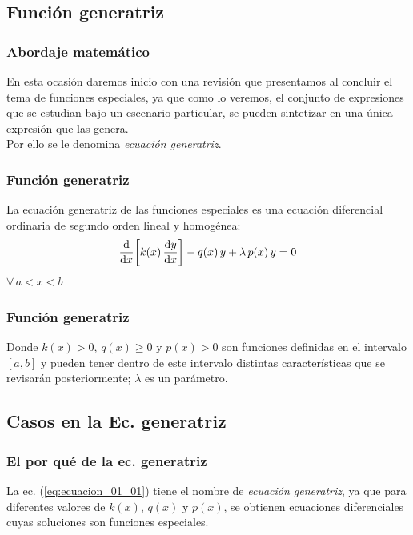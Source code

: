 \documentclass[12pt]{beamer}
\begin{document}
\subsection{Función generatriz}

\begin{frame}
\frametitle{Abordaje matemático}
En esta ocasión daremos inicio con una revisión que presentamos al concluir el tema de funciones especiales, ya que como lo veremos, el conjunto de expresiones que se estudian bajo un escenario particular, se pueden sintetizar en una única expresión que las genera.
\\
\bigskip
\pause
Por ello se le denomina \emph{ecuación generatriz}.
\end{frame}
\begin{frame}
\frametitle{Función generatriz}
La ecuación generatriz de las funciones especiales es una ecuación diferencial ordinaria de segundo orden lineal y homogénea:
\pause
\begin{align}
\dv{x} \bigg[ k(x) \, \dv{y}{x} \bigg] -  q(x) \, y + \lambda \, p(x) \, y = 0
\label{eq:ecuacion_01_01}
\end{align}
$\forall \, a < x < b$
\end{frame}
\begin{frame}
\frametitle{Función generatriz}
Donde $k(x) > 0$, $q(x) \geq 0$ y $p(x) > 0$ son funciones definidas en el intervalo $[a, b]$ \pause y pueden tener dentro de este intervalo distintas características que se revisarán posteriormente; $\lambda$ es un parámetro.
\end{frame}

\subsection{Casos en la Ec. generatriz}

\begin{frame}
\frametitle{El por qué de la ec. generatriz}
La ec. (\ref{eq:ecuacion_01_01}) tiene el nombre de \emph{\textcolor{darkcerulean}{ecuación generatriz}}, \pause ya que para diferentes valores de $k(x)$, $q(x)$ y $p(x)$, se obtienen ecuaciones diferenciales cuyas soluciones son funciones especiales.
\end{frame}
\end{document}
